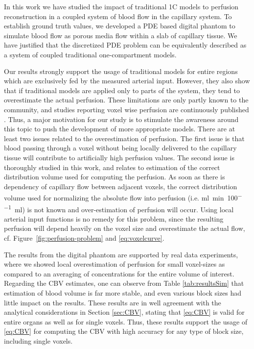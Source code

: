 \documentclass[journal,twocolumn]{IEEEtran}
\newcommand{\siPml}{\milli\litre\per\minute\per100\milli\litre}
\begin{document}
	
	In this work we have studied the impact of traditional 1C models to perfusion reconstruction in a coupled system of blood flow in the capillary system.
	To establish ground truth values, we developed a PDE based digital phantom to simulate blood flow as porous media flow within a slab of capillary tissue.
	We have justified that the discretized PDE problem can be equivalently described as a system of coupled traditional one-compartment models.	

	Our results strongly support the usage of traditional models for entire regions which are exclusively fed by the measured arterial input.
	However, they also show that if traditional models are applied only to parts of the system, they tend to overestimate the actual perfusion. 
	These limitations are only partly known to the community, and studies reporting voxel wise perfusion are continuously published \cite{Mokin16,Kickingereder15}. 
	Thus, a major motivation for our study is to stimulate the awareness around this topic to push the development of more appropriate models.
	There are at least two issues related to the overestimation of perfusion. 
	The first issue is that blood passing through a voxel without being locally delivered to the capillary tissue will contribute to artificially high perfusion values. 
	The second issue is thoroughly studied in this work, and relates to estimation of the correct distribution volume used for computing the perfusion. As soon as there is dependency of capillary flow between adjacent voxels, the correct distribution volume used for normalizing the absolute flow into perfusion (i.e. \si{\siPml}) is not known and over-estimation of perfusion will occur. 
	Using local arterial input functions is no remedy for this problem, since the resulting perfusion will depend heavily on the voxel size and overestimate the actual flow, cf. Figure~\ref{fig:perfusion-problem} and \eqref{eq:voxelcurve}.

	The results from the digital phantom are supported by real data experiments, where we showed local overestimation of perfusion for small voxel-sizes as compared to an averaging of concentrations for the entire volume of interest.
	Regarding the CBV estimates, one can observe from Table \ref{tab:resultsSim} that estimation of blood volume is far more stable, and  even various block sizes had little impact on the results. 
	These results are in well agreement with the analytical considerations in Section \ref{sec:CBV}, stating that \eqref{eq:CBV} is valid for entire organs as well as for single voxels. 
	Thus, these results support the usage of \eqref{eq:CBV} for computing the CBV with high accuracy for any type of block size, including single voxels.
\end{document}

